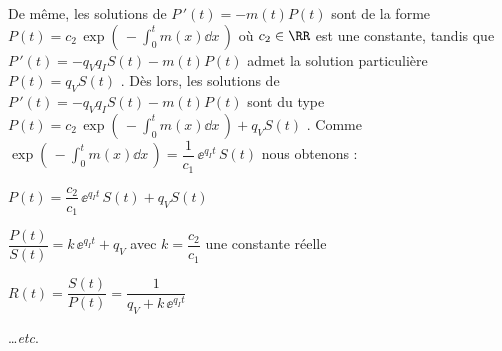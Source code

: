 \medskip

De même, les solutions de $P\,'(t) = - m(t) P(t)$ sont de la forme $\displaystyle P(t) = c_2 \, \exp \left( \, - \int_0^t m(x) \dd{x} \, \right)$ où $c_2 \in \RR$ est une constante, tandis que $P\,'(t) = - q_V q_I S(t) - m(t) P(t)$ admet la solution particulière $P(t) = q_V S(t)$ .
Dès lors, les solutions de $P\,'(t) = - q_V q_I S(t) - m(t) P(t)$ sont du type
$\displaystyle P(t) = c_2 \, \exp \left( \, - \int_0^t m(x) \dd{x} \, \right) + q_V S(t)$ .
Comme $\displaystyle \exp \left( \, - \int_0^t m(x) \dd{x} \, \right) = \dfrac{1}{c_1} \, \ee^{q_I t} \, S(t)$ nous obtenons :

\medskip

$P(t) = \dfrac{c_2}{c_1} \, \ee^{q_I t} \, S(t) + q_V S(t)$

\medskip

$\dfrac{P(t)}{S(t)} = k \, \ee^{q_I t} + q_V$ avec $k = \dfrac{c_2}{c_1}$ une constante réelle

\medskip

$R(t) = \dfrac{S(t)}{P(t)} = \dfrac{1}{q_V + k \, \ee^{q_I t}}$

\medskip

\dots \emph{etc}.
